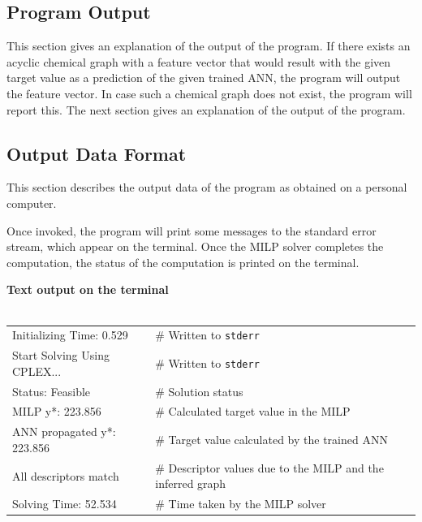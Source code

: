 \documentclass[11pt, titlepage, dvipdfmx, twoside]{article}
\begin{document}
\subsection{Program Output}
\label{sec:section3_3}

This section gives an explanation of the output of the program.
If there exists an acyclic chemical graph with a feature vector that
would result with the given target value as a prediction of
the given trained ANN, the program will output the feature vector.
In case such a chemical graph does not exist, the program will report this.
The next section gives an explanation of the output of the program.


\subsection{Output Data Format}
\label{sec:section3_4}

This section describes the output data of the program as
obtained on a personal computer.

Once invoked, the program will print some messages to the standard error
stream, which appear on the terminal.
Once the MILP solver completes the computation,
the status of the computation is printed on the terminal.

\bigskip

\begin{oframed}
{\bf Text output on the terminal}\\\\
\begin{tabular}{l l}
 Initializing Time: 0.529                &         \# Written to {\tt stderr} \\
Start Solving Using CPLEX...      &       \# Written to {\tt stderr} \\
Status: Feasible 				&       \# Solution status \\
MILP y*: 223.856 				&      \# Calculated target value in the MILP  \\
ANN propagated y*: 223.856     &      \# Target value calculated by the trained ANN  \\
All descriptors match    		&      \# Descriptor values due to the MILP and the inferred  graph \\
Solving Time: 52.534                     &      \# Time taken by the MILP solver \\
\end{tabular}



\end{oframed}
\end{document}
